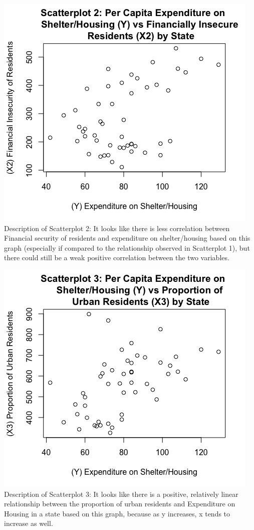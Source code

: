 \documentclass[12pt,letterpaper]{article}
\begin{document}
\begin{itemize}
		\newpage	
		 
	
		\begin{center}
		\includegraphics[scale=.80]{Scatterplot2.png}
		Description of Scatterplot 2: It looks like there is less correlation between Financial security of residents and expenditure on shelter/housing based on this graph (especially if compared to the relationship observed in Scatterplot 1), but there could still be a weak positive correlation between the two variables.
		\end{center}
	
		\newpage	
		 
		
		\begin{center}
		\includegraphics[scale=.80]{Scatterplot3.png}
		Description of Scatterplot 3: It looks like there is a positive, relatively linear relationship between the proportion of urban residents and Expenditure on Housing in a state based on this graph, because as y increases, x tends to increase as well. 
		\end{center}
	

\end{itemize}
\end{document}
